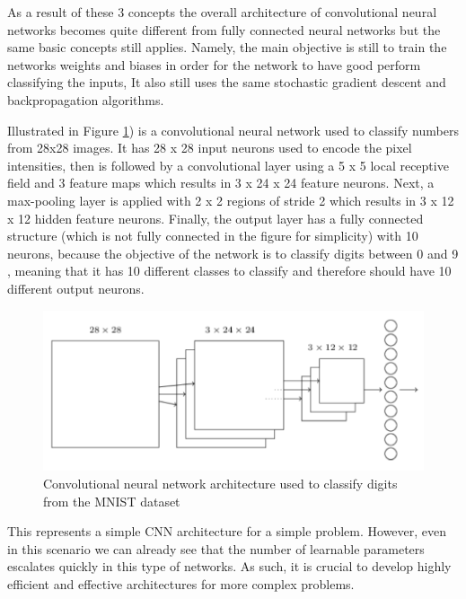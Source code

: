 As a result of these 3 concepts the overall architecture of convolutional neural networks becomes quite different from fully connected neural networks but the same basic concepts still applies. Namely, the main objective is still to train the networks weights and biases in order for the network to have good perform classifying the inputs, It also still uses the same stochastic gradient descent and backpropagation algorithms. \par 
Illustrated in Figure \ref{fig:cnn}) is a convolutional neural network used to classify numbers from 28x28 images. It has  28 x 28 input neurons used to encode the pixel intensities, then is followed by a convolutional layer using a 5 x 5 local receptive field and 3 feature maps which results in 3 x 24 x 24 feature neurons. Next, a max-pooling layer is applied with 2 x 2 regions of stride 2 which results in 3 x 12 x 12 hidden feature neurons. Finally, the output layer has a fully connected structure (which is not fully connected in the figure for simplicity) with 10 neurons, because the objective of the network is to classify digits between 0 and 9 , meaning that it has 10 different classes to classify and therefore should have 10 different output neurons. \par
\begin{figure}[ht]
  \centering
    \includegraphics[width=0.5\linewidth]{figs/cnn.png}
  \caption{Convolutional neural network architecture used to classify digits from the MNIST dataset \cite{Nielsen2017a}}
  \label{fig:cnn}
\end{figure}
This represents a simple CNN architecture for a simple problem. However, even in this scenario we can already see that the number of learnable parameters escalates quickly in this type of networks. As such, it is crucial to develop highly efficient and effective architectures for more complex problems. 
